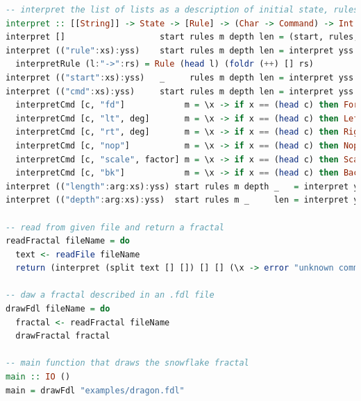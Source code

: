 \documentclass{article}
\begin{document}
\begin{lstlisting}[language=Haskell]
-- interpret the list of lists as a description of initial state, rules, mapping, depth, and length of a fractal
interpret :: [[String]] -> State -> [Rule] -> (Char -> Command) -> Int -> Double -> Fractal
interpret []                   start rules m depth len = (start, rules, m, depth, len)
interpret (("rule":xs):yss)    start rules m depth len = interpret yss start (rules ++ [interpretRule xs]) m depth len where
  interpretRule (l:"->":rs) = Rule (head l) (foldr (++) [] rs)
interpret (("start":xs):yss)   _     rules m depth len = interpret yss (foldr (++) [] xs) rules m depth len
interpret (("cmd":xs):yss)     start rules m depth len = interpret yss start rules (interpretCmd xs m) depth len where
  interpretCmd [c, "fd"]            m = \x -> if x == (head c) then Forward else m x
  interpretCmd [c, "lt", deg]       m = \x -> if x == (head c) then LeftTurn (read deg) else m x
  interpretCmd [c, "rt", deg]       m = \x -> if x == (head c) then RightTurn (read deg) else m x
  interpretCmd [c, "nop"]           m = \x -> if x == (head c) then Nop else m x
  interpretCmd [c, "scale", factor] m = \x -> if x == (head c) then Scale (read factor) else m x
  interpretCmd [c, "bk"]            m = \x -> if x == (head c) then Backward else m x
interpret (("length":arg:xs):yss) start rules m depth _   = interpret yss start rules m depth (read arg)
interpret (("depth":arg:xs):yss)  start rules m _     len = interpret yss start rules m (read arg) len

-- read from given file and return a fractal
readFractal fileName = do
  text <- readFile fileName
  return (interpret (split text [] []) [] [] (\x -> error "unknown command") 0 0)

-- daw a fractal described in an .fdl file
drawFdl fileName = do
  fractal <- readFractal fileName
  drawFractal fractal

-- main function that draws the snowflake fractal
main :: IO ()
main = drawFdl "examples/dragon.fdl"
\end{lstlisting}
\end{document}
